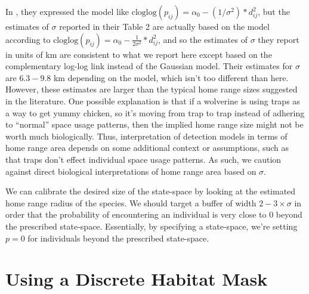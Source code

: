In \citet{royle_etal:2011jwm}, they expressed the model like
$\mbox{cloglog}(p_{ij}) = \alpha_{0} - (1/\sigma^2)*d_{ij}^2$, but the
estimates of $\sigma$ reported in their Table 2 are actually based on
the model according to $\mbox{cloglog}(p_{ij}) = \alpha_{0} -
\frac{1}{2\sigma^2}*d_{ij}^2$, and so the estimates of $\sigma$ they
report in units of km are consistent to what we report here except
based on the complementary log-log link instead of the Gaussian
model.
Their estimates for $\sigma$ are $6.3-9.8$ km
depending on the model,  which isn't too different than here.
However, these estimates are larger than the typical home range sizes
suggested in the literature.
One possible explanation is that
if a wolverine is using traps as a way to get yummy chicken, so it's
moving from  trap to trap instead of adhering to ``normal'' space
usage patterns, then the implied home range size might not
be worth much biologically.
Thus, interpretation of detection models in terms of
home range area depends on some additional context or assumptions,
such as that
traps don't effect individual space usage
patterns. As such, we caution against direct biological
interpretations of home range area based on $\sigma$.

We can calibrate the
desired size of the state-space by looking at the estimated home range
radius of the species. We should target a buffer of width $2-3 \times
\sigma$ in order that the probability of encountering an individual is
very close to 0 beyond the prescribed state-space. Essentially, by specifying a
state-space, we're setting $p=0$ for individuals beyond the prescribed state-space.





\section{Using a Discrete Habitat Mask}
\label{scr0.sec.discrete}

